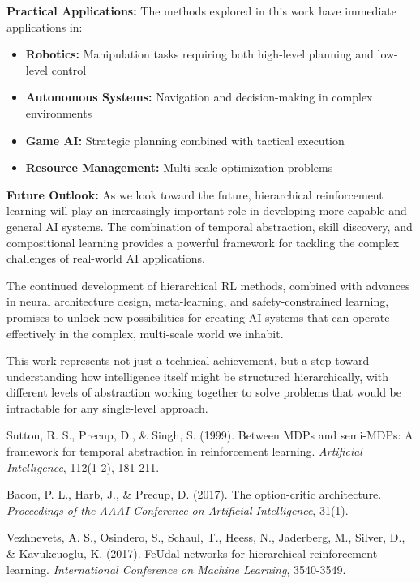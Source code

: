 \documentclass[12pt]{article}
\begin{document}
{{\textbf{Practical Applications:}
The methods explored in this work have immediate applications in:
\begin{itemize}
    \item \textbf{Robotics:} Manipulation tasks requiring both high-level planning and low-level control
    \item \textbf{Autonomous Systems:} Navigation and decision-making in complex environments
    \item \textbf{Game AI:} Strategic planning combined with tactical execution
    \item \textbf{Resource Management:} Multi-scale optimization problems
\end{itemize}

\textbf{Future Outlook:}
As we look toward the future, hierarchical reinforcement learning will play an increasingly important role in developing more capable and general AI systems. The combination of temporal abstraction, skill discovery, and compositional learning provides a powerful framework for tackling the complex challenges of real-world AI applications.

The continued development of hierarchical RL methods, combined with advances in neural architecture design, meta-learning, and safety-constrained learning, promises to unlock new possibilities for creating AI systems that can operate effectively in the complex, multi-scale world we inhabit.

This work represents not just a technical achievement, but a step toward understanding how intelligence itself might be structured hierarchically, with different levels of abstraction working together to solve problems that would be intractable for any single-level approach.

\begin{thebibliography}{9}

Sutton, R. S., Precup, D., \& Singh, S. (1999). Between MDPs and semi-MDPs: A framework for temporal abstraction in reinforcement learning. \textit{Artificial Intelligence}, 112(1-2), 181-211.

Bacon, P. L., Harb, J., \& Precup, D. (2017). The option-critic architecture. \textit{Proceedings of the AAAI Conference on Artificial Intelligence}, 31(1).

Vezhnevets, A. S., Osindero, S., Schaul, T., Heess, N., Jaderberg, M., Silver, D., \& Kavukcuoglu, K. (2017). FeUdal networks for hierarchical reinforcement learning. \textit{International Conference on Machine Learning}, 3540-3549.


\end{thebibliography}}}
\end{document}
